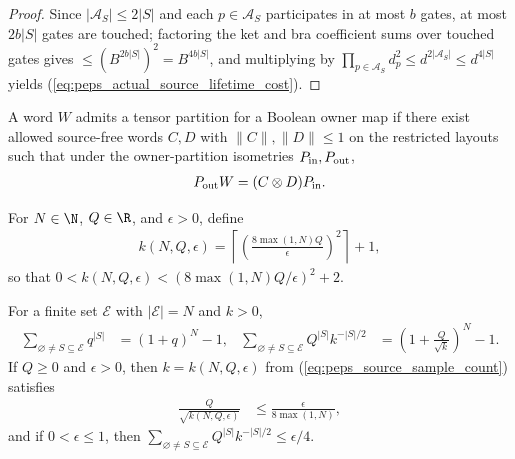 \begin{proof}\leanok
    Since $|\mathcal A_S|\le 2|S|$ and each $p\in\mathcal A_S$ participates in
    at most $b$ gates, at most $2b|S|$ gates are touched; factoring the ket and
    bra coefficient sums over touched gates gives $\le (B^{2b|S|})^2=B^{4b|S|}$,
    and multiplying by $\prod_{p\in\mathcal A_S}d_p^2\le d^{2|\mathcal A_S|}\le d^{4|S|}$
    yields (\ref{eq:peps_actual_source_lifetime_cost}).
\end{proof}

\begin{definition}
    \label{def:peps_actual_tensor_partition}
    \leanok
    A word $W$ admits a tensor partition for a Boolean owner map if there exist
    allowed source-free words $C,D$ with $\|C\|,\|D\|\leq1$ on the restricted
    layouts such that under the owner-partition isometries $P_{\rm in},P_{\rm out}$,
    \begin{align}
        P_{\rm out}W=(C\otimes D)P_{\rm in}.
        \label{eq:peps_actual_tensor_partition}
    \end{align}
\end{definition}


\begin{definition}
    \label{def:peps_source_sample_count}
    \leanok
    For $N\in\N$, $Q\in\R$, and $\epsilon>0$, define
    \begin{align}
        k(N,Q,\epsilon)=
        \left\lceil\left(\frac{8\max(1,N)Q}{\epsilon}\right)^2\right\rceil+1,
        \label{eq:peps_source_sample_count}
    \end{align}
    so that $0<k(N,Q,\epsilon)<(8\max(1,N)Q/\epsilon)^2+2$.
\end{definition}

\begin{lemma}
    \label{thm:peps_source_sample_count_bound}
    \leanok
    For a finite set $\mathcal E$ with $|\mathcal E|=N$ and $k>0$,
    \begin{align}
        \sum_{\varnothing\ne S\subseteq\mathcal E}q^{|S|}
         & =(1+q)^N-1,                            &
        \sum_{\varnothing\ne S\subseteq\mathcal E}Q^{|S|}k^{-|S|/2}
         & =\left(1+\frac{Q}{\sqrt k}\right)^N-1.
        \label{eq:peps_source_subset_sums}
    \end{align}
    If $Q\geq0$ and $\epsilon>0$, then $k=k(N,Q,\epsilon)$ from
    (\ref{eq:peps_source_sample_count}) satisfies
    \begin{align}
        \frac{Q}{\sqrt{k(N,Q,\epsilon)}}
         & \leq\frac{\epsilon}{8\max(1,N)},
        \label{eq:peps_source_sample_ratio}
    \end{align}
    and if $0<\epsilon\leq1$, then
    $\sum_{\varnothing\ne S\subseteq\mathcal E}Q^{|S|}k^{-|S|/2}\le\epsilon/4$.
\end{lemma}

